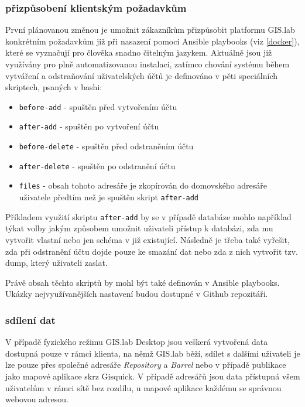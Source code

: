 \subsubsection{přizpůsobení klientským požadavkům}
První plánovanou změnou je umožnit zákazníkům přizpůsobit platformu GIS.lab konkrétním požadavkům již při nasazení pomocí Ansible playbooks (viz \ref{docker}), které se vyznačují pro člověka snadno čitelným jazykem. Aktuálně jsou již využívány pro plně automatizovanou instalaci, zatímco chování systému během vytváření a odstraňování uživatelských účtů je definováno v pěti speciálních skriptech, psaných v bashi:
\begin{itemize}
\item \texttt{before-add} - spuštěn před vytvořením účtu
\item \texttt{after-add} - spuštěn po vytvoření účtu
\item \texttt{before-delete} - spuštěn před odstraněním účtu
\item \texttt{after-delete} - spuštěn po odstranění účtu
\item \texttt{files} - obsah tohoto adresáře je zkopírován do domovského adresáře uživatele předtím než je spuštěn skript \texttt{after-add}
\end{itemize}
Příkladem využití skriptu \texttt{after-add} by se v případě databáze mohlo například týkat volby jakým způsobem umožnit uživateli přístup k databázi, zda mu vytvořit vlastní nebo jen schéma v již existující. Následně je třeba také vyřešit, zda při odstranění účtu dojde pouze ke smazání dat nebo zda z nich vytvořit tzv. dump, který uživateli zaslat. 

Právě obsah těchto skriptů by mohl být také definován v Ansible playbooks. Ukázky nejvyužívanějších nastavení budou dostupné v Github repozitáři. 

\subsubsection{sdílení dat}

V případě fyzického režimu GIS.lab Desktop jsou veškerá vytvořená data dostupná pouze v rámci klienta, na němž GIS.lab běží, sdílet s dalšími uživateli je lze pouze přes společné adresáře \textit{Repository} a \textit{Barrel} nebo v případě publikace jako mapové aplikace skrz Gisquick. V případě adresářů jsou data přístupná všem uživatelům v rámci sítě bez rozdílu, u mapové aplikace každému se správnou webovou adresou. 

